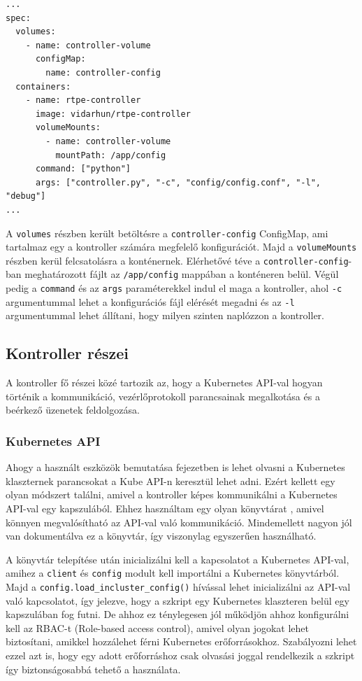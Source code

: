 \begin{lstlisting}[caption=Kubernetes konténer specifikációja, label=lst:kubeSpec]
...
spec:
  volumes:
    - name: controller-volume
      configMap:
        name: controller-config
  containers:
    - name: rtpe-controller
      image: vidarhun/rtpe-controller
      volumeMounts:
        - name: controller-volume
          mountPath: /app/config
      command: ["python"]
      args: ["controller.py", "-c", "config/config.conf", "-l", "debug"]
...
\end{lstlisting}

A \texttt{volumes} részben került betöltésre a \texttt{controller-config} ConfigMap, ami 
tartalmaz egy a kontroller számára megfelelő konfigurációt. Majd a 
\texttt{volumeMounts} részben kerül felcsatolásra a konténernek. Elérhetővé téve a 
\texttt{controller-config}-ban meghatározott fájlt az \texttt{/app/config} mappában a 
konténeren belül. Végül pedig a \texttt{command} és az \texttt{args} paraméterekkel indul 
el maga a kontroller, ahol \texttt{-c} argumentummal lehet a konfigurációs fájl elérését 
megadni és az \texttt{-l} argumentummal lehet állítani, hogy milyen szinten naplózzon a 
kontroller.

\subsection{Kontroller részei}

A kontroller fő részei közé tartozik az, hogy a Kubernetes API-val 
hogyan történik a kommunikáció, vezérlőprotokoll parancsainak megalkotása és
a beérkező üzenetek feldolgozása. 

\subsubsection{Kubernetes API}

Ahogy a használt eszközök bemutatása fejezetben is lehet olvasni a Kubernetes
klaszternek parancsokat a Kube API-n keresztül lehet adni. Ezért kellett egy olyan
módszert találni, amivel a kontroller képes kommunikálni a Kubernetes API-val 
egy kapszulából. Ehhez használtam egy olyan könyvtárat \cite{pythonKubeAPI}, amivel
könnyen megvalósítható az API-val való kommunikáció. Mindemellett nagyon jól
van dokumentálva ez a könyvtár, így viszonylag egyszerűen használható.

A könyvtár telepítése után inicializálni kell a kapcsolatot a Kubernetes 
API-val, amihez a \texttt{client} és \texttt{config} modult kell importálni
a Kubernetes könyvtárból. Majd a \texttt{config.load\_incluster\_config()}
hívással lehet inicializálni az API-val való kapcsolatot, így jelezve, hogy a
szkript egy Kubernetes klaszteren belül egy kapszulában fog futni. De ahhoz ez 
ténylegesen jól működjön ahhoz konfigurálni kell az RBAC-t (Role-based access control), 
amivel olyan jogokat lehet biztosítani, amikkel hozzálehet férni Kubernetes  
erőforrásokhoz. Szabályozni lehet ezzel azt is, hogy egy adott erőforráshoz  csak 
olvasási joggal rendelkezik a szkript így biztonságosabbá tehető a használata.

